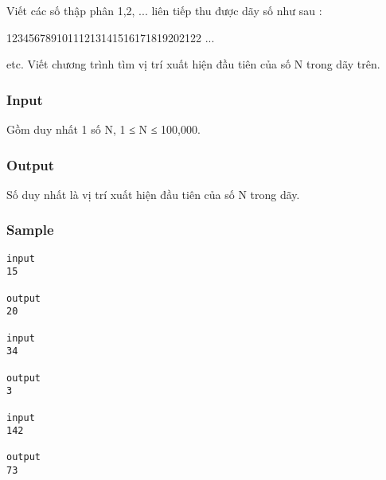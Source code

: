 



   Viết các số thập phân 1,2, ... liên tiếp thu được dãy số như sau :  

   12345678910111213141516171819202122 ...  

   etc.  Viết chương trình tìm vị trí xuất hiện đầu tiên của số N trong dãy trên.  



\subsubsection{   Input  }



   Gồm duy nhất 1 số N, 1 ≤ N ≤ 100,000.  





\subsubsection{   Output  }



   Số duy nhất là vị trí xuất hiện đầu tiên của số N trong dãy.  



\subsubsection{   Sample  }
\begin{verbatim}
input 
15 
 
output 
20

input 
34 
 
output 
3 

input 
142 
 
output 
73 
\end{verbatim}